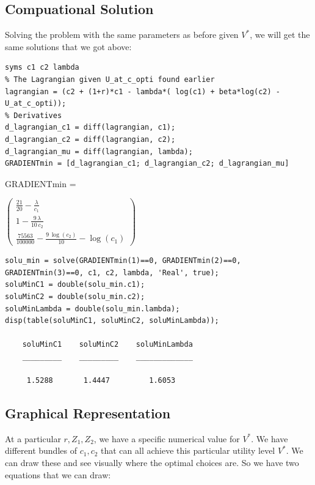 \documentclass[
]{book}
\begin{document}
\hypertarget{compuational-solution}{%
\subsection{Compuational Solution}\label{compuational-solution}}

Solving the problem with the same parameters as before given \(V^*\), we
will get the same solutions that we got above:

\begin{verbatim}
syms c1 c2 lambda
% The Lagrangian given U_at_c_opti found earlier
lagrangian = (c2 + (1+r)*c1 - lambda*( log(c1) + beta*log(c2) - U_at_c_opti));
% Derivatives
d_lagrangian_c1 = diff(lagrangian, c1);
d_lagrangian_c2 = diff(lagrangian, c2);
d_lagrangian_mu = diff(lagrangian, lambda);
GRADIENTmin = [d_lagrangian_c1; d_lagrangian_c2; d_lagrangian_mu]
\end{verbatim}

GRADIENTmin =

\(\displaystyle \left(\begin{array}{c} \frac{21}{20}-\frac{\lambda }{c_1 }\\ 1-\frac{9\,\lambda }{10\,c_2 }\\ \frac{75563}{100000}-\frac{9\,\log \left(c_2 \right)}{10}-\log \left(c_1 \right) \end{array}\right)\)

\begin{verbatim}
solu_min = solve(GRADIENTmin(1)==0, GRADIENTmin(2)==0, GRADIENTmin(3)==0, c1, c2, lambda, 'Real', true);
soluMinC1 = double(solu_min.c1);
soluMinC2 = double(solu_min.c2);
soluMinLambda = double(solu_min.lambda);
disp(table(soluMinC1, soluMinC2, soluMinLambda));

    soluMinC1    soluMinC2    soluMinLambda
    _________    _________    _____________

     1.5288       1.4447         1.6053    
\end{verbatim}

\hypertarget{graphical-representation}{%
\subsection{Graphical Representation}\label{graphical-representation}}

At a particular \(r,Z_1 ,Z_2\), we have a specific numerical value for
\(V^*\). We have different bundles of \(c_1 ,c_2\) that can all achieve this
particular utility level \(V^*\). We can draw these and see visually where
the optimal choices are. So we have two equations that we can draw:
\end{document}
